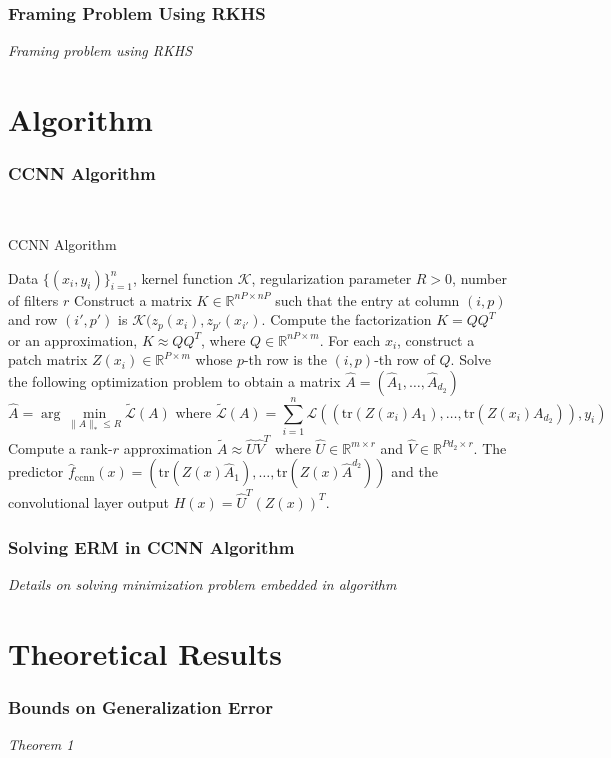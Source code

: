 \documentclass[hyperref={colorlinks}]{beamer}
\newcommand{\set}[1]{\mathbb{#1}}
\newcommand{\trace}[1]{\mathrm{tr}\left(#1\right)}
\begin{document}
\begin{frame}
	\frametitle{Framing Problem Using RKHS}
	\textit{Framing problem using RKHS}
\end{frame}

\section{Algorithm}
\begin{frame}
	\frametitle{CCNN Algorithm}
	~
	\begin{algorithm}[H]
		\caption{CCNN Algorithm}
		\label{alg:ccnn-algorithm}
		\footnotesize
		\begin{algorithmic}[1]
			\REQUIRE Data $\{(x_i, y_i)\}_{i = 1}^n$, kernel function $\mathcal{K}$, regularization parameter $R > 0$, number of filters $r$
			\STATE Construct a matrix $K \in \set{R}^{nP \times nP}$ such that the entry at column $(i, p)$ and row $(i', p')$ is $\mathcal{K}(z_p(x_i), z_{p'}(x_{i'})$. Compute the factorization $K = QQ^T$ or an approximation, $K \approx QQ^T$, where $Q \in \set{R}^{nP \times m}$.
			\STATE For each $x_i$, construct a patch matrix $Z(x_i) \in \set{R}^{P \times m}$ whose $p$-th row is the $(i, p)$-th row of $Q$.
			\STATE Solve the following optimization problem to obtain a matrix $\hat{A} = (\hat{A}_1, \ldots, \hat{A}_{d_2})$
			$$\hat{A} = \arg \min_{\|A\|_* \leq R} \tilde{\mathcal{L}}(A) \text{ where } \tilde{\mathcal{L}}(A) = \sum_{i = 1}^n \mathcal{L}\left((\trace{Z(x_i) A_1}, \ldots, \trace{Z(x_i) A_{d_2}}), y_i\right)$$
			\STATE Compute a rank-$r$ approximation $\tilde{A} \approx \hat{U} \hat{V}^T$ where $\hat{U} \in \set{R}^{m \times r}$ and $\hat{V} \in \set{R}^{Pd_2 \times r}$.
			\RETURN The predictor $\hat{f}_{\text{ccnn}}(x) = \left(\trace{Z(x) \hat{A}_1}, \ldots, \trace{Z(x) \hat{A}^{d_2}}\right)$ and the convolutional layer output $H(x) = \hat{U}^T (Z(x))^T$.
		\end{algorithmic}
	\end{algorithm}
\end{frame}

\begin{frame}
	\frametitle{Solving ERM in CCNN Algorithm}
	\textit{Details on solving minimization problem embedded in algorithm}
\end{frame}

\section{Theoretical Results}
\begin{frame}
	\frametitle{Bounds on Generalization Error}
	\textit{Theorem 1}
\end{frame}
\end{document}
